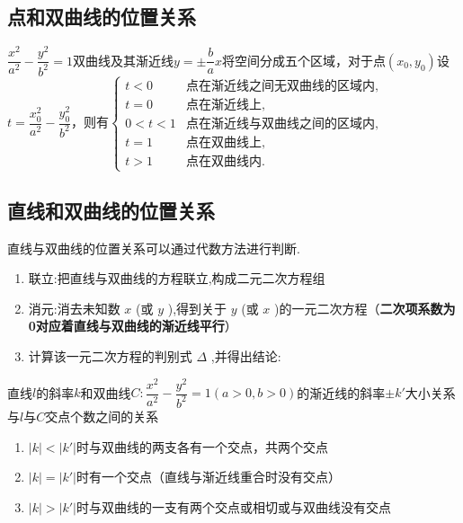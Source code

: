 \subsection*{点和双曲线的位置关系}
$\dfrac{x^2}{a^2} - \dfrac{y^2}{b^2} = 1$双曲线及其渐近线$y = \pm \dfrac{b}{a}x$将空间分成五个区域，对于点$(x_0, y_0)$设$t = \dfrac{x_0^2}{a^2} - \dfrac{y_0^2}{b^2}$，则有$
\begin{cases}
t < 0 & \text{点在渐近线之间无双曲线的区域内}, \\
t = 0 & \text{点在渐近线上}, \\
0 < t < 1 & \text{点在渐近线与双曲线之间的区域内}, \\
t = 1 & \text{点在双曲线上}, \\
t > 1 & \text{点在双曲线内}.
\end{cases}$
\subsection*{直线和双曲线的位置关系}
直线与双曲线的位置关系可以通过代数方法进行判断.
\begin{enumerate}
    \item 联立:把直线与双曲线的方程联立,构成二元二次方程组
    \item 消元:消去未知数 $x$ (或 $y$ ),得到关于 $y$ (或 $x$ )的一元二次方程（\textbf{二次项系数为0对应着直线与双曲线的渐近线平行}）
    \item 计算该一元二次方程的判别式 $\Delta$ ,并得出结论:
\end{enumerate}
直线$l$的斜率$k$和双曲线$C: \dfrac{{x}^{2}}{{a}^{2}} - \dfrac{{y}^{2}}{{b}^{2}} = 1\left( {a > 0, b > 0}\right)$的渐近线的斜率$\pm k'$大小关系与$l$与$C$交点个数之间的关系
\begin{enumerate}
    \item $|k| < |k'|$时与双曲线的两支各有一个交点，共两个交点
    \item $|k| = |k'|$时有一个交点（直线与渐近线重合时没有交点）
    \item $|k| > |k'|$时与双曲线的一支有两个交点或相切或与双曲线没有交点
\end{enumerate}

